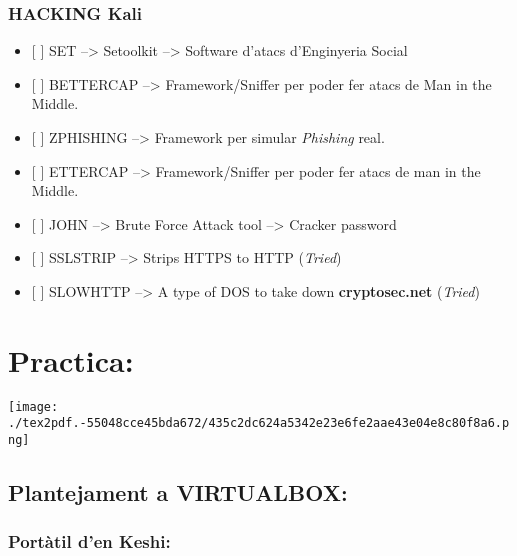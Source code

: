 \documentclass[]{article}
\providecommand{\tightlist}{%
  \setlength{\itemsep}{0pt}\setlength{\parskip}{0pt}}
\begin{document}
\hypertarget{hacking-kali}{%
\subsubsection{\texorpdfstring{\textbf{HACKING
Kali}}{HACKING Kali}}\label{hacking-kali}}

\begin{itemize}
\tightlist
\item
  {[} {]} SET --\textgreater{} Setoolkit --\textgreater{} Software
  d'atacs d'Enginyeria Social
\item
  {[} {]} BETTERCAP --\textgreater{} Framework/Sniffer per poder fer
  atacs de Man in the Middle.
\item
  {[} {]} ZPHISHING --\textgreater{} Framework per simular
  \emph{Phishing} real.
\item
  {[} {]} ETTERCAP --\textgreater{} Framework/Sniffer per poder fer
  atacs de man in the Middle.
\item
  {[} {]} JOHN --\textgreater{} Brute Force Attack tool --\textgreater{}
  Cracker password
\item
  {[} {]} SSLSTRIP --\textgreater{} Strips HTTPS to HTTP (\emph{Tried})
\item
  {[} {]} SLOWHTTP --\textgreater{} A type of DOS to take down
  \textbf{cryptosec.net} (\emph{Tried})
\end{itemize}

\hypertarget{practica}{%
\section{\texorpdfstring{\textbf{Practica:}}{Practica:}}\label{practica}}

\texttt{[image: ./tex2pdf.-55048cce45bda672/435c2dc624a5342e23e6fe2aae43e04e8c80f8a6.png]}

\hypertarget{plantejament-a-virtualbox}{%
\subsection{\texorpdfstring{\textbf{Plantejament a
VIRTUALBOX}:}{Plantejament a VIRTUALBOX:}}\label{plantejament-a-virtualbox}}

\hypertarget{portuxe0til-den-keshi}{%
\subsubsection{\texorpdfstring{\textbf{Portàtil d'en
Keshi}:}{Portàtil d'en Keshi:}}\label{portuxe0til-den-keshi}}
\end{document}

